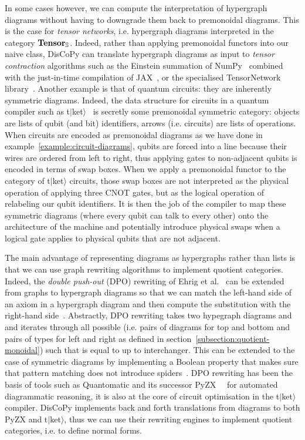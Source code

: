 In some cases however, we can compute the interpretation of hypergraph diagrams without having to downgrade them back to premonoidal diagrams.
This is the case for \emph{tensor networks}, i.e. hypergraph diagrams interpreted in the category $\mathbf{Tensor}_\S$.
Indeed, rather than applying premonoidal functors into our naive  class, DisCoPy can translate hypergraph diagrams as input to \emph{tensor contraction} algorithms such as the Einstein summation of NumPy~\cite{VanDerWaltEtAl11} combined with the just-in-time compilation of JAX~\cite{BradburyEtAl20}, or the specialised TensorNetwork library~\cite{RobertsEtAl19}.
Another example is that of quantum circuits: they are inherently symmetric diagrams.
Indeed, the data structure for circuits in a quantum compiler such as t$\vert$ket$\rangle$~\cite{SivarajahEtAl20} is secretly some premonoidal symmetric category: objects are lists of qubit (and bit) identifiers, arrows (i.e. circuits) are lists of operations.
When circuits are encoded as premonoidal diagrams as we have done in example~\ref{example:circuit-diagrams}, qubits are forced into a line because their wires are ordered from left to right, thus applying gates to non-adjacent qubits is encoded in terms of swap boxes.
When we apply a premonoidal functor to the category of t$\vert$ket$\rangle$ circuits, those swap boxes are not interpreted as the physical operation of applying three CNOT gates, but as the logical operation of relabeling our qubit identifiers.
It is then the job of the compiler to map these symmetric diagrams (where every qubit can talk to every other) onto the architecture of the machine and potentially introduce physical swaps when a logical gate applies to physical qubits that are not adjacent.

The main advantage of representing diagrams as hypergraphs rather than lists is that we can use graph rewriting algorithms to implement quotient categories.
Indeed, the \emph{double push-out} (DPO) rewriting of Ehrig et al.~\cite{EhrigEtAl73} can be extended from graphs to hypergraph diagrams so that we can match the left-hand side of an axiom in a hypergraph diagram and then compute the substitution with the right-hand side~\cite{BonchiEtAl20}.
Abstractly, DPO rewriting takes two hypegraph diagrams  and  and iterates through all possible  (i.e. pairs of diagrams for top and bottom and pairs of types for left and right as defined in section~\ref{subsection:quotient-monoidal}) such that  is equal to  up to interchanger.
This can be extended to the case of symmetric diagrams by implementing a Boolean property  that makes sure that pattern matching does not introduce spiders~\cite{BonchiEtAl16}.
DPO rewriting has been the basis of tools such as Quantomatic and its successor PyZX~\cite{KissingerVanDeWetering19}~\cite{KissingerZamdzhiev15} for automated diagrammatic reasoning, it is also at the core of circuit optimisation in the t$\vert$ket$\rangle$ compiler.
DisCoPy implements back and forth translations from diagrams to both PyZX and t$\vert$ket$\rangle$, thus we can use their rewriting engines to implement quotient categories, i.e. to define normal forms.

